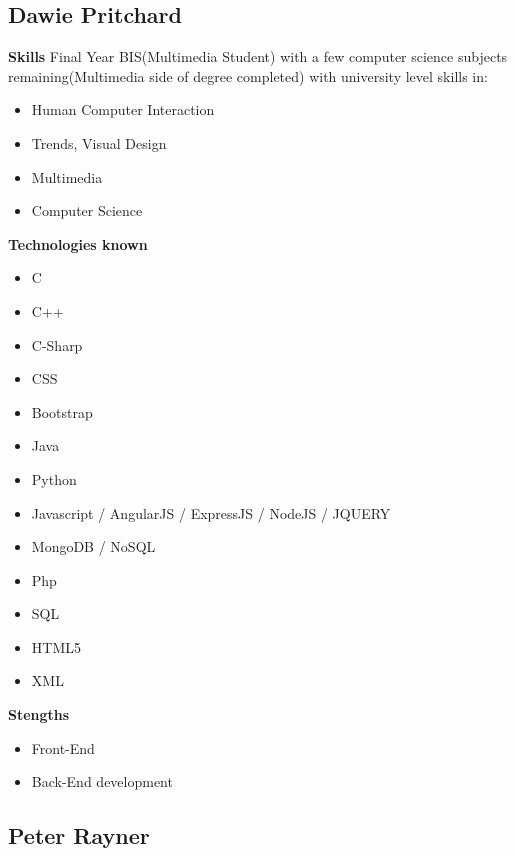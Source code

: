 \documentclass{article}
\begin{document}
\subsection{Dawie Pritchard}
\textbf{Skills}
Final Year BIS(Multimedia Student) with a few computer science subjects remaining(Multimedia side of degree completed) with  university level skills in:
\begin{itemize}
 	\item Human Computer Interaction
 	\item Trends, Visual Design 
 	\item Multimedia
 	\item Computer Science
\end {itemize}
\textbf{Technologies known}
\begin{itemize} 
	\item C
 	\item C++
 	\item C-Sharp
 	\item CSS
 	\item Bootstrap
 	\item Java
 	\item Python
 	\item Javascript / AngularJS / ExpressJS / NodeJS / JQUERY
 	\item MongoDB / NoSQL
 	\item Php
 	\item SQL
 	\item HTML5
 	\item XML
 \end{itemize}
\textbf{Stengths} 
\begin{itemize}
	\item Front-End
	\item Back-End development
\end{itemize}

\subsection {Peter Rayner}
\end{document}
